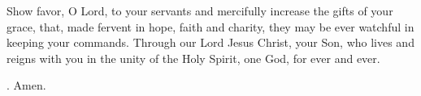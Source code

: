 \lettrine[lines=3]{S}{}how favor, O Lord, to your servants
and mercifully increase the gifts of your grace,
that, made fervent in hope, faith and charity,
they may be ever watchful in keeping your commands.
Through our Lord Jesus Christ, your Son,
who lives and reigns with you in the unity of the Holy Spirit,
one God, for ever and ever. \par \Rbar. Amen.
